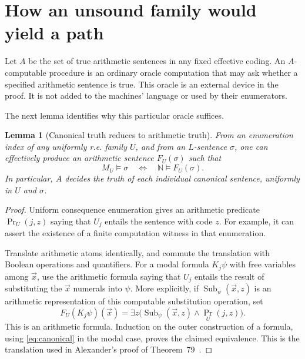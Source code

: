 \documentclass[11pt]{article}
\newtheorem{lemma}[theorem]{Lemma}
\theoremstyle{definition}
\newcommand{\N}{\mathbb N}
\begin{document}
\section{How an unsound family would yield a path}\label{sec:soundness}

Let $A$ be the set of true arithmetic sentences in any fixed effective
coding. An $A$-computable procedure is an ordinary oracle computation that
may ask whether a specified arithmetic sentence is true. This oracle is an
external device in the proof. It is not added to the machines' language or
used by their enumerators.

The next lemma identifies why this particular oracle suffices.

\begin{lemma}[Canonical truth reduces to arithmetic truth]\label{lem:translation}
From an enumeration index of any uniformly r.e. family $U$, and from an
$L$-sentence $\sigma$, one can effectively produce an arithmetic sentence
$F_U(\sigma)$ such that
\begin{equation}\label{eq:arithmetic-translation}
 M_U\models\sigma
 \quad\Longleftrightarrow\quad\N\models F_U(\sigma).
\end{equation}
In particular, $A$ decides the truth of each individual canonical sentence,
uniformly in $U$ and $\sigma$.
\end{lemma}

\begin{proof}
Uniform consequence enumeration gives an arithmetic predicate
$\operatorname{Pr}_U(j,z)$ saying that $U_j$ entails the sentence with code
$z$. For example, it can assert the existence of a finite computation
witness in that enumeration.

Translate arithmetic atoms identically, and commute the translation with
Boolean operations and quantifiers. For a modal formula $K_j\psi$ with
free variables among $\vec x$, use the arithmetic formula saying that
$U_j$ entails the result of substituting the $\vec x$ numerals into
$\psi$. More explicitly, if
$\operatorname{Sub}_\psi(\vec x,z)$ is an arithmetic representation of
this computable substitution operation, set
\[
 F_U(K_j\psi)(\vec x)=
 \exists z\bigl(\operatorname{Sub}_\psi(\vec x,z)
                 \wedge\operatorname{Pr}_U(j,z)\bigr).
\]
This is an arithmetic formula. Induction on the outer construction of a
formula, using \eqref{eq:canonical} in the modal case, proves the claimed
equivalence. This is the translation used in Alexander's proof of
Theorem~79~\cite{alexander}.
\end{proof}
\end{document}
